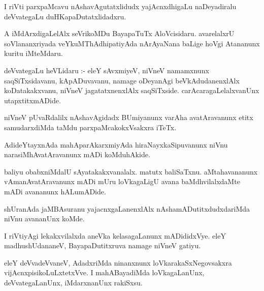 \documentclass{article}
\begin{document}
\begin{mn}
I riVti  parxpaMcavu  nAshavAgutatxlidudx  yajAcnxdhigaLu  naDeyadiralu  
deVvategaLu  duHKapaDutatxlidadxru.
\end{mn}

\begin{mn}
A  iMdArxdigaLelAlx  seVrikoMDu  BayapaTuTx  AloVcisidaru.  avarelalxrU  soVlananxriyada  
veYkuMThAdhipatiyAda  nArAyaNana  baLige  hoVgi  Atananunx  kuritu  iMteMdaru.
\end{mn}

\begin{mn}
deVvategaLu  heVLidaru :- eleY  sAvxmiyeV,  niVneV  namamxnunx  saqSiTxsidavanu,  
kApADuvavanu,  namage  oDeyanAgi  beVkAdudanenxlAlx  koDatakakxvanu,  niVneV  
jagatatxnenxlAlx  saqSiTxside.  carAcaragaLelalxvanUnx  utapxtitxmADide.
\end{mn}

\begin{mn}
niVneV  pUvaRdalilx  nAshavAgidadx  BUmiyanunx  varAha  avatAravanunx  etitx  
samudarxdiMda  taMdu  parxpaMcakokxVsakxra  iTeTx.
\end{mn}

\begin{mn}  
AdideYtayxnAda  mahAparAkarxmiyAda  hiraNayxkaSipuvanunx  niVnu  narasiMhAvatAravanunx  
mADi  koMduhAkide.
\end{mn}

\begin{mn}
baliyu  obabxniMdalU  sAyatakakxvanalalx.  matutx  baliSaTxnu.  aMtahavananunx  vAmanAvatAravanunx  
mADi  mUru  loVkagaLigU  avana  baMdhvilalxdaMte  mADi  avananunx  hALumADide.
\end{mn}

\begin{mn}
shUranAda  jaMBAsuranu  yajacnxgaLanenxlAlx  nAshamADutitxdudxdariMda  niVnu  avananUnx  koMde.
\end{mn}

\begin{mn}
I riVtiyAgi  lekakxvilalxda  aneVka  kelasagaLanunx  mADididxVye.  eleY  madhushUdananeV,  
BayapaDutitxruva  namage  niVneV  gatiyu.
\end{mn}

\begin{mn}
eleY  deVvadeVvaneV,  AdadxriMda   ninanxnunx  loVkarakaSxNegovsakxra  vijAcnxpisikoLuLxtetxVve.  
I  mahABayadiMda  loVkagaLanUnx,  deVvategaLanUnx,  iMdarxnanUnx  rakiSxsu.
\end{mn}
\end{document}
